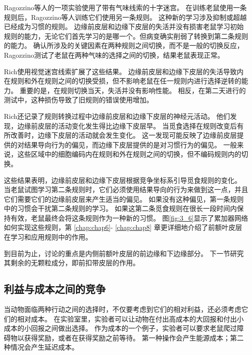 Ragozzino等人\cite{ragozzino1999involvement}的一项实验使用了带有气味线索的十字迷宫。
在训练老鼠使用一条规则后，Ragozzino等人训练它们使用另一条规则。
这种新的学习涉及抑制或超越已经成为习惯的规则。
边缘前皮层和边缘下皮层的失活并没有损害老鼠学习初始规则的能力，无论它们首先学习的是哪一个。但病变确实削弱了转换到第二条规则的能力。
确认所涉及的关键因素在两种规则之间切换，而不是一般的切换反应，Ragozzino\cite{ragozzino2007contribution}测试了老鼠在两种气味的选择之间的切换，结果老鼠表现正常。\par


Rich\cite{rich2007prelimbic}使用视觉迷宫线索扩展了这些结果。
边缘前皮层和边缘下皮层的失活导致内在规则和外在规则之间的切换受损，但不影响老鼠在任一规则内进行选择逆转的能力。
重要的是，在规则切换当天，失活并没有影响性能。
相反，在第二天进行的测试中，这种损伤导致了旧规则的错误使用增加。\par


Rich\cite{rich2009rat}还记录了规则转换过程中边缘前皮层和边缘下皮层的神经元活动。
他们发现，边缘前皮层的活动变化发生得比边缘下皮层早。
当觅食选择在规则改变后有所改善时，边缘下皮层的活动就会发生变化。
这一发现可能反映了边缘前皮层提供的对结果导向行为的偏见，而边缘下皮层提供的是对习惯行为的偏见。
一般来说，这些区域中的细胞编码内在规则和外在规则之间的切换，但不编码规则内的切换。\par


这些结果表明，边缘前皮层和边缘下皮层根据竞争坐标系引导觅食规则的变化。
当老鼠试图学习第二条规则时，它们必须使用结果导向的行为来做到这一点，并且它们需要它们的边缘前皮层来产生适当的偏见。
如果没有这种偏见，第一条规则中的习惯会干扰第二条规则的学习。
如果这第二条觅食规则在很长一段时间内保持有效，老鼠最终会将这条规则作为一种新的习惯。
图\ref{fig:3_6}显示了累加器网络如何实现这些规则，第 \ref{chap:chap6}- \ref{chap:chap8} 章更详细地介绍了前额叶皮层在学习和应用规则中的作用。\par


到目前为止，讨论的重点是内侧前额叶皮层的前边缘和下边缘部分。
下一节研究其剩余的无颗粒成分，即前扣带皮层的作用。\par



\subsection{利益与成本之间的竞争}

当动物面临两种行动之间的选择时，不仅要考虑到它们的相对利益，还必须考虑它们的相对成本。
在实验室里，实验者可以让动物在付出高成本的大回报和付出小成本的小回报之间做出选择。
作为成本的一个例子，实验者可以要求老鼠爬过障碍物以获得奖励\cite{salamone1997behavioral}，或者在获得奖励之前等待\cite{cardinal2001impulsive}。
第一种操作会产生能源成本；第二种情况会产生延迟成本。\par


